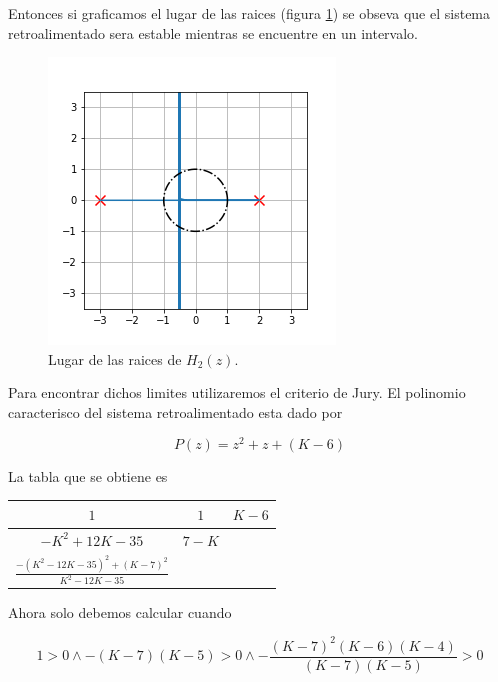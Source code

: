 \documentclass{article}
\begin{document}
            Entonces si graficamos el lugar de las raices (figura \ref{fig:8-b-rlocus}) se obseva que el sistema retroalimentado sera estable mientras 
            se encuentre en un intervalo. 

            \begin{figure}[!htb]
                \centering
                \includegraphics[width=.4\textwidth]{Img/8-b-rlocus.png}
                \caption{Lugar de las raices de $H_2(z)$.}
                \label{fig:8-b-rlocus}
            \end{figure}

            Para encontrar dichos limites utilizaremos el criterio de Jury. El polinomio caracterisco del sistema retroalimentado esta dado por 

            \begin{equation}
                P(z) = z^2 + z + ( K-6 )
            \end{equation}

            La tabla que se obtiene es 

            \begin{table}[H]
                \centering
                \begin{tabular}{|c|c|c|}
                    \hline $1$ & $1$ & $K-6$ \\
                    \hline $-K^2 +12K - 35$ & $7-K$ &  \\
                    \hline $\frac{-(K^2 - 12K -35)^2 + (K-7)^2}{K^2 - 12K -35}$ & & \\
                    \hline
                \end{tabular}
            \end{table}

            Ahora solo debemos calcular cuando 

            \begin{equation}
                1 > 0 \land - (K-7)(K-5) > 0 \land -\frac{(K-7)^2(K-6)(K-4)}{(K-7)(K-5)} > 0
            \end{equation}
\end{document}
